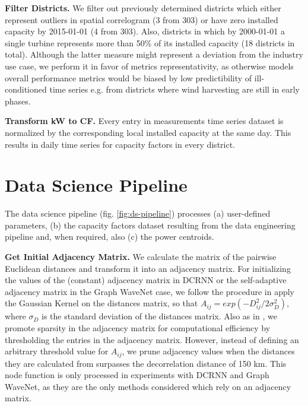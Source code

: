 \vspace{1em}
\noindent
\textbf{Filter Districts.}   We filter out previously determined districts  which either represent outliers in spatial correlogram (3 from 303) or have zero installed capacity by 2015-01-01 (4 from 303).
Also, districts in which by 2000-01-01 a single turbine represents more than 50\% of its installed capacity (18 districts in total).
Although the latter measure might represent a deviation from the industry use case, we perform it in favor of metrics representativity, as otherwise models overall performance metrics would be biased by low predictibility of ill-conditioned time series e.g. from districts where wind harvesting are still in early phases.

\vspace{1em}
\noindent
\textbf{Transform kW to CF.}  Every entry in measurements time series dataset is normalized by the corresponding local installed capacity at the same day.
This results in daily time series for capacity factors in every district.

\pagebreak

\section{Data Science Pipeline}
The data science pipeline (fig. \ref{fig:ds-pipeline}) processes (a) user-defined parameters, (b) the capacity factors dataset resulting from the data engineering pipeline and, when required, also (c) the power centroids.

\vspace{1em}
\noindent
\textbf{Get Initial Adjacency Matrix.}  We calculate the matrix of the pairwise Euclidean distances and transform it into an adjacency matrix.
For initializing the values of the (constant) adjacency matrix in DCRNN or the self-adaptive adjacency matrix in the Graph WaveNet case, we follow the procedure in \cite{li2018dcrnn, wu2019graphwavenet} apply the Gaussian Kernel on the distances matrix, so that $A_{ij} = exp(-D_{ij}^2/2\sigma_{D}^2)$, where $\sigma_{D}$ is the standard deviation of the distances matrix.
Also as in \cite{DCRNN}, we promote sparsity in the adjacency matrix for computational efficiency by thresholding the entries in the adjacency matrix.
However, instead of defining an arbitrary threshold value for $A_{ij}$, we prune adjacency values when the distances they are calculated from surpasses the decorrelation distance of 150 km.
This node function is only processed in experiments with DCRNN and Graph WaveNet, as they are the only methods considered which rely on an adjacency matrix.

